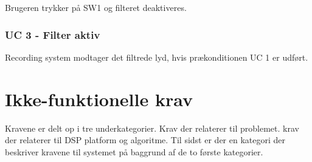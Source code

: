 Brugeren trykker på SW1 og filteret deaktiveres. 

\subsubsection{UC 3 - Filter aktiv}

Recording system modtager det filtrede lyd, hvis prækonditionen UC 1  er udført. 

\newpage
\section{Ikke-funktionelle krav}
Kravene er delt op i tre underkategorier. Krav der relaterer til problemet. krav der relaterer til DSP platform og algoritme. Til sidst er der en kategori der beskriver kravene til systemet på baggrund af de to første kategorier.
